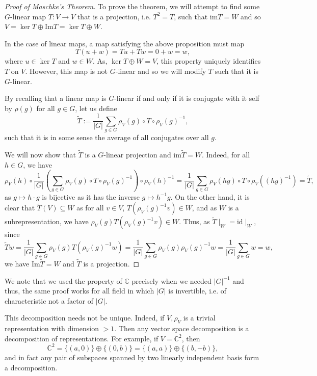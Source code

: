 \documentclass[]{article}
\theoremstyle{definition}
\theoremstyle{definition}
\begin{document}
\begin{proof}[Proof of Maschke's Theorem]
  To prove the theorem, we will attempt to find some \(G\)-linear map 
  \(T : V \to V\) that is a projection, i.e. \(T^2 = T\), such that 
  \(\text{im} T = W\) and so \(V = \ker T \oplus \text{Im} T = \ker T \oplus W\).

  In the case of linear maps, a map satisfying the above proposition must map
  \[T(u + w) = Tu + Tw = 0 + w = w,\]
  where \(u \in \ker T\) and \(w \in W\). As, \(\ker T \oplus W = V\), this 
  property uniquely identifies \(T\) on \(V\). However, this map is not 
  \(G\)-linear and so we will modify \(T\) such that it is \(G\)-linear. 
  
  By recalling that a linear map is \(G\)-linear if and only if it is conjugate 
  with it self by \(\rho(g)\) for all \(g \in G\), let us define 
  \[\tilde T := \frac{1}{|G|} \sum_{g \in G} \rho_V(g) \circ T \circ \rho_V(g)^{-1},\]
  such that it is in some sense the average of all conjugates over all \(g\).

  We will now show that \(\tilde T\) is a \(G\)-linear projection and 
  \(\text{im} \tilde T = W\). Indeed, for all \(h \in G\), we have 
  \[\rho_V(h) \circ \frac{1}{|G|} 
    \left(\sum_{g \in G} \rho_V(g) \circ T \circ \rho_V(g)^{-1}\right) \circ
    \rho_V(h)^{-1} = 
    \frac{1}{|G|} \sum_{g \in G} \rho_V(hg) \circ T \circ \rho_V((hg)^{-1})
    = \tilde T,\]
  as \(g \mapsto h \cdot g\) is bijective as it has the inverse 
  \(g \mapsto h^{-1} g\). On the other hand, it is clear that 
  \(\tilde T(V) \subseteq W\) as for all \(v \in V\), \(T(\rho_V(g)^{-1}v) \in W\), 
  and as \(W\) is a subrepresentation, we have \(\rho_V(g)T(\rho_V(g)^{-1}v) \in W\).
  Thus, as \(\tilde T\mid_W = \text{id}\mid_W\), since 
  \[\tilde T w = \frac{1}{|G|} \sum_{g \in G} \rho_V(g)T(\rho_V(g)^{-1}w) = 
    \frac{1}{|G|} \sum_{g \in G} \rho_V(g) \rho_V(g)^{-1} w =
    \frac{1}{|G|} \sum_{g \in G} w = w,\] 
  we have \(\text{Im} \tilde T = W\) and \(\tilde T\) is a projection.
\end{proof}

We note that we used the property of \(\mathbb{C}\) precisely when we needed 
\(|G|^{-1}\) and thus, the same proof works for all field in which \(|G|\) is 
invertible, i.e. of characteristic not a factor of \(|G|\).

This decomposition needs not be unique. Indeed, if \(V, \rho_V\) is a trivial 
representation with dimension \(>1\). Then any vector space decomposition is 
a decomposition of representations. For example, if \(V = \mathbb{C}^2\), 
then 
\[\mathbb{C}^2 = \{(a, 0)\} \oplus \{(0, b)\} = \{(a, a)\} \oplus \{(b, -b)\},\]
and in fact any pair of subspaces spanned by two linearly independent basis 
form a decomposition.
\end{document}
